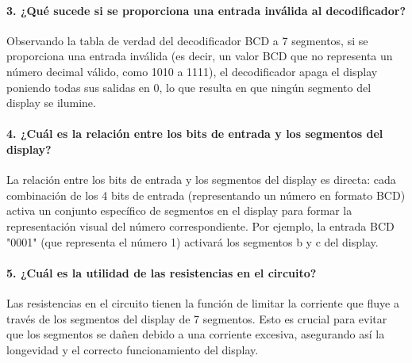 \paragraph{3. ¿Qué sucede si se proporciona una entrada inválida al decodificador?}

Observando la tabla de verdad del decodificador BCD a 7 segmentos, si se proporciona una entrada inválida (es decir, un valor BCD que no representa un número decimal válido, como 1010 a 1111), el decodificador apaga el display poniendo todas sus salidas en 0, lo que resulta en que ningún segmento del display se ilumine.

\paragraph{4. ¿Cuál es la relación entre los bits de entrada y los segmentos del display?}

La relación entre los bits de entrada y los segmentos del display es directa: cada combinación de los 4 bits de entrada (representando un número en formato BCD) activa un conjunto específico de segmentos en el display para formar la representación visual del número correspondiente. Por ejemplo, la entrada BCD "0001" (que representa el número 1) activará los segmentos b y c del display.

\paragraph{5. ¿Cuál es la utilidad de las resistencias en el circuito?}

Las resistencias en el circuito tienen la función de limitar la corriente que fluye a través de los segmentos del display de 7 segmentos. Esto es crucial para evitar que los segmentos se dañen debido a una corriente excesiva, asegurando así la longevidad y el correcto funcionamiento del display.